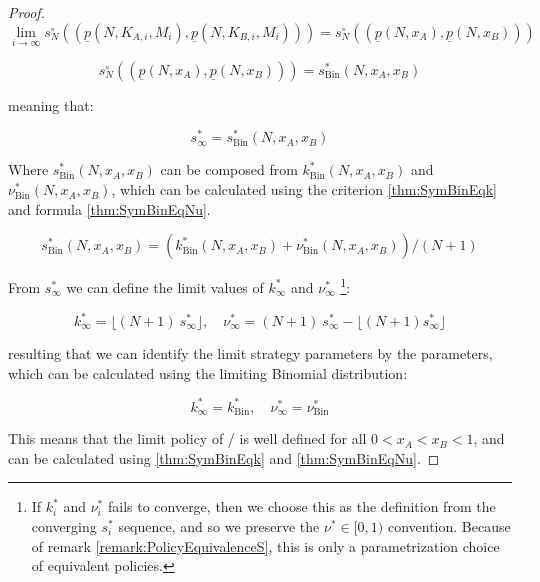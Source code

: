 \documentclass{article}
\theoremstyle{definition}
\begin{document}
\begin{proof}
\begin{equation}
    \lim_{i\to\infty} s^\circ_N((\underline{p}(N,K_{A,i},M_i),\underline{p}(N,K_{B,i},M_i))) = s^\circ_N((\underline{p}(N,x_A),\underline{p}(N,x_B)))
\end{equation}

\begin{equation}
    s^\circ_N((\underline{p}(N,x_A),\underline{p}(N,x_B))) = s^*_\text{Bin}(N,x_A,x_B)
\end{equation}

meaning that:

\begin{equation}
    s^*_\infty = s^*_\text{Bin}(N,x_A,x_B)
\end{equation}

Where $s^*_\text{Bin}(N,x_A,x_B)$ can be composed from $k^*_\text{Bin}(N,x_A,x_B)$ and $\nu^*_\text{Bin}(N,x_A,x_B)$, which can be calculated using the criterion \ref{thm:SymBinEqk} and formula \ref{thm:SymBinEqNu}.

\begin{equation}
    s^*_\text{Bin}(N,x_A,x_B) = (k^*_\text{Bin}(N,x_A,x_B) + \nu^*_\text{Bin}(N,x_A,x_B))/(N+1)
\end{equation}

From $s^*_\infty$ we can define the limit values of $k^*_\infty$ and $\nu^*_\infty$ \footnote{If $k^*_i$ and $\nu^*_i$ fails to converge, then we choose this as the definition from the converging $s^*_i$ sequence, and so we preserve the $\nu^* \in [0,1)$ convention. Because of remark \ref{remark:PolicyEquivalenceS}, this is only a parametrization choice of equivalent policies.}:

\begin{equation}
    k^*_\infty = \lfloor (N+1) \ s^*_\infty \rfloor, \quad
    \nu^*_\infty = (N+1) \ s^*_\infty - \lfloor (N+1) s^*_\infty \rfloor
\end{equation}

resulting that we can identify the limit strategy parameters by the parameters, which can be calculated using the limiting Binomial distribution:

\begin{equation}
    k^*_\infty = k^*_\text{Bin}, \quad \nu^*_\infty = \nu^*_\text{Bin}
\end{equation}

This means that the limit policy of \PI/ is well defined for all $0<x_A<x_B<1$, and can be calculated using \ref{thm:SymBinEqk} and \ref{thm:SymBinEqNu}.


\end{proof}
\end{document}
